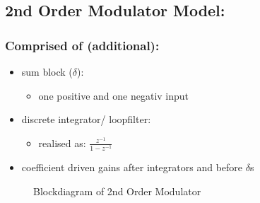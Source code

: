 \documentclass[
  letterpaper,
  DIV=11,
  numbers=noendperiod]{scrartcl}
\makeatletter
\providecommand{\tightlist}{%
  \setlength{\itemsep}{0pt}\setlength{\parskip}{0pt}}\usepackage{longtable,booktabs,array}
\newcommand*\pandocbounded[1]{%
  \sbox\pandoc@box{#1}%
  \Gscale@div\@tempa{\textheight}{\dimexpr\ht\pandoc@box+\dp\pandoc@box\relax}%
  \Gscale@div\@tempb{\linewidth}{\wd\pandoc@box}%
  \ifdim\@tempb\p@<\@tempa\p@\let\@tempa\@tempb\fi%
  \ifdim\@tempa\p@<\p@\scalebox{\@tempa}{\usebox\pandoc@box}%
  \else\usebox{\pandoc@box}%
  \fi%
}
\makeatother
\begin{document}
\subsection{2nd Order Modulator Model:}\label{nd-order-modulator-model}

\subsubsection{Comprised of
(additional):}\label{comprised-of-additional}

\begin{itemize}
\tightlist
\item
  sum block (\(\delta\)):

  \begin{itemize}
  \tightlist
  \item
    one positive and one negativ input
  \end{itemize}
\item
  discrete integrator/ loopfilter:

  \begin{itemize}
  \tightlist
  \item
    realised as: \(\frac{z^{-1}}{1-z^{-1}}\)
  \end{itemize}
\item
  coefficient driven gains after integrators and before \(\delta\)s
\end{itemize}

\begin{figure}[H]

{\centering \pandocbounded{}

}

\caption{Blockdiagram of 2nd Order Modulator}

\end{figure}%
\end{document}

